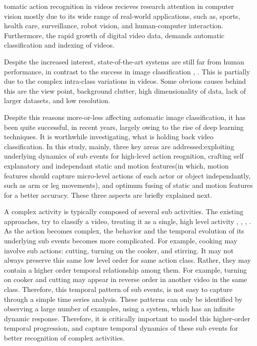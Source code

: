 tomatic action recognition in videos recieves research attention  
in computer vision mostly due to its wide range of real-world applications, such as, 
sports, health care, surveillance, robot vision, and human-computer interaction.
Furthermore, the rapid growth of digital video data, demands automatic
classification and indexing of videos. 

    


Despite the increased interest, state-of-the-art
systems are still far from human performance, in contrast to the success in image classification \cite{girshick2014rich},
 \cite{krizhevsky2012imagenet}. This is
partially due to the complex intra-class variations in videos. Some
obvious causes behind this are the view point, background 
clutter, high dimensionality of data, lack of larger datasets, and low resolution. 

Despite this reasons more-or-less affecting automatic image classification, it has been quite successful, in recent years,
largely owing to the rise of deep learning techniques. It is worthwhile investigating,
what is holding back video classification. In this study, mainly, three key
areas are addressed:exploiting underlying dynamics of sub events for high-level action reognition, crafting 
self explanatory and independant static and motion features(in which, motion features should capture micro-level actions
of each actor or object independantly, such as arm or leg movements), and optimum fusing of static and motion features for a better accuracy. 
These three aspects are briefly explained next.

A complex activity is typically composed of several sub activities. 
The existing approaches, try to classify a video, treating it as a 
single, high level activity \cite{wang2011action}, \cite{wang2013action}, \cite{simonyan2014two}, 
\cite{7486474}.
As the action becomes complex, the behavior and the 
temporal evolution of its underlying sub events becomes more complicated. For example,
cooking may involve sub actions: cutting, turning on the cooker, and stirring. It may not always preserve this 
same low level order for same action class. Rather, they may contain 
a higher order temporal relationship among them. For example, turning on cooker and cutting
may appear in reverse order in another video in the same class. 
Therefore, this temporal pattern of sub events, is not easy to capture through a simple
time series analysis. These patterns can only be identified by observing a large number
of examples, using a system, which has an infinite dynamic response. Therefore, it is critically important to
model this higher-order temporal
progression, and capture temporal dynamics of these sub events for better recognition of
complex activities. 

